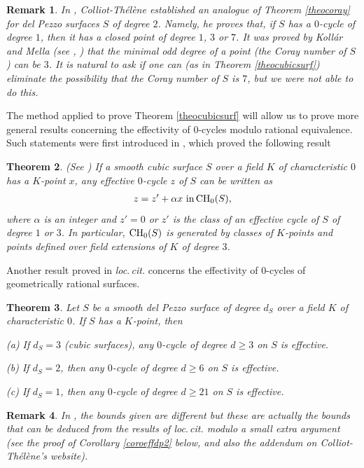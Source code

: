 \documentclass[10pt]{article}
\newtheorem{theo}{Theorem}[section]
\newtheorem{rema}[theo]{Remark}
\begin{document}
\begin{rema}{\rm  In \cite{colliot}, Colliot-Th\'{e}l\`{e}ne established an analogue of Theorem \ref{theocoray} for del Pezzo surfaces $S$ of degree $2$. Namely, he proves that, if $S$ has a $0$-cycle of degree $1$, then it has a closed point of degree $1$,  $3$ or $7$. It was proved by Koll\'ar and Mella (see \cite{kollarmella}, \cite{colliot}) that the minimal odd degree of a point (the Coray number of $S$) can be $3$. It is natural to ask if one  can (as in Theorem \ref{theocubicsurf}) eliminate the possibility that the Coray number of $S$ is $7$,  but we were not able to do this. }
\end{rema}

The method applied to prove Theorem \ref{theocubicsurf} will allow us to prove more general results concerning  the effectivity of $0$-cycles  modulo rational equivalence. Such statements were first introduced in \cite{colliot}, which proved the following result
\begin{theo} (See \cite[Th\'{e}or\`{e}me 3.3]{colliot}) If a smooth cubic surface $S$ over a field $K$ of characteristic $0$  has a $K$-point $x$,  any effective  $0$-cycle $z$ of $S$ can be written as
\begin{eqnarray}\label{eqformcyclecaspoint}   z= z'+\alpha x\,\,{\rm in}\,{\rm CH}_0(S),\end{eqnarray}
where $\alpha$ is an integer and $z'=0$ or $z'$ is the class of an effective cycle  of $S$  of degree  $1$ or  $3$. In particular, ${\rm CH}_0(S)$ is generated by classes of $K$-points and points defined over field extensions of $K$ of degree $3$.
\end{theo}
Another result proved in {\it loc$.\,$cit.} concerns the effectivity of $0$-cycles of geometrically rational surfaces.
\begin{theo} \cite[Th\'{e}or\`{e}mes 3.3,  4.4, 5.1]{colliot}\label{theocollioteffective}  Let $S$ be a smooth del Pezzo surface of degree $d_S$ over a field $K$ of characteristic $0$. If $S$  has a $K$-point, then

(a) If $d_S=3$ (cubic surfaces),  any $0$-cycle of degree $d\geq 3$ on $S$ is effective.

(b) If  $d_S=2$, then any $0$-cycle of degree $d\geq 6$ on $S$ is effective.

(c) If  $d_S=1$, then any $0$-cycle of degree $d\geq 21$ on $S$ is effective.
\end{theo}
\begin{rema}{\rm In \cite{colliot}, the  bounds given   are   different  but these are  actually the bounds that can be deduced from  the results of {\it loc$.\,$cit.} modulo a  small extra argument (see the proof of Corollary \ref{coroeffdp2} below, and  also the addendum on   Colliot-Th\'{e}l\`{e}ne's website). }
\end{rema}
\end{document}
